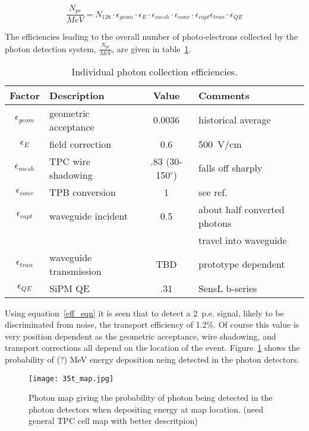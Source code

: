 \begin{equation}\label{eff_eqn}
\frac{N_{pe}}{MeV} = N_{128}\cdot \epsilon_{geom} \cdot \epsilon_{E} \cdot
\epsilon_{mesh} \cdot \epsilon_{conv} \cdot \epsilon_{capt}
\epsilon_{tran} \cdot \epsilon_{QE} 
\end{equation}

The efficiencies leading to the overall number of photo-electrons
collected by the photon detection system, $\frac{N_{pe}}{MeV}$, are given
in table~\ref{Table-Eff}.

\begin{table}[ht]
  \begin{center}
    \caption{Individual photon collection efficiencies.}
    \label{Table-Eff}
    \begin{tabular}{ c | l | c | l }
      \hline
      \hline
      Factor & Description & Value & Comments  \\
      \hline
      $\epsilon_{geom}$ & geometric acceptance & 0.0036 & historical
      average  \\
      $\epsilon_{E}$ & field correction & 0.6 & 500~V/cm  \\
      $\epsilon_{mesh}$ & TPC wire shadowing & .83 (30-150$^{\circ}$)
      & falls off sharply~\cite{HimmelMesh}  \\
      $\epsilon_{conv}$ & TPB conversion & 1 & see
      ref.~\cite{bib:gehman}  \\
      $\epsilon_{capt}$ & waveguide incident & 0.5 & about half
      converted photons\\
      &  & & travel into waveguide  \\
      $\epsilon_{tran}$ & waveguide transmission & TBD  & prototype
      dependent  \\
     $\epsilon_{QE}$ & SiPM QE & .31  & SensL b-series  \\
      \hline
      \hline
    \end{tabular}
  \end{center}
\end{table}

Using equation~\ref{eff_eqn} it is seen that to detect a
2~p.e. signal, likely to be discriminated from noise, the transport
efficiency of 1.2\%. Of course this value is very position dependent
as the geometric acceptance, wire shadowing, and transport corrections
all depend on the location of the event. Figure~\ref{photon_map}
shows the probability of (?) MeV energy deposition neing detected in
the photon detectors. 

\begin{figure}[h!]
  \centering
  \texttt{[image: 35t\_map.jpg]}
\caption{Photon map giving the probability of photon being detected in
  the photon detectors when depositing energy at map location. (need
  general TPC cell map with better descritpion)}
\label{photon_map}
\end{figure}

